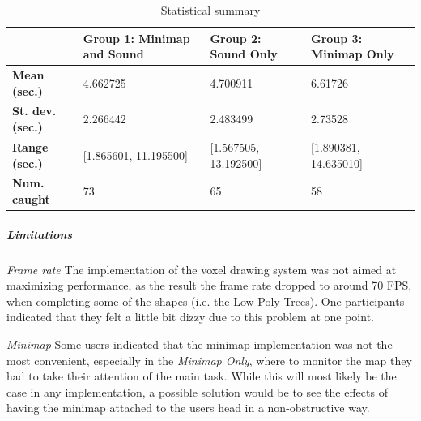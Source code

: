 \begin{table}[h]
	\begin{tabular}{|l|l|l|l|}
		\hline
		& \textbf{Group 1: Minimap and Sound} & \textbf{Group 2: Sound Only} & \textbf{Group 3: Minimap Only} \\ \hline
		\textbf{Mean (sec.)}  & 4.662725                            & 4.700911                     & 6.61726                        \\ \hline
		\textbf{St. dev. (sec.)}  & 2.266442                            & 2.483499                     & 2.73528                        \\ \hline
		\textbf{Range (sec.)} & {[}1.865601, 11.195500{]}           & {[}1.567505, 13.192500{]}    & {[}1.890381, 14.635010{]}      \\ \hline
		\textbf{Num. caught}  & 73                                  & 65                           & 58                             \\ \hline
	\end{tabular}

	\label{tab:final_study_stats}
	\caption{Statistical summary}
\end{table}

\subparagraph{Limitations} %
\textit{Frame rate} The implementation of the voxel drawing system was not aimed at maximizing performance, as the result the frame rate dropped to around 70 FPS, when completing some of the shapes (i.e. the Low Poly Trees). One participants indicated that they felt a little bit dizzy due to this problem at one point.

\textit{Minimap} Some users indicated that the minimap implementation was not the most convenient, especially in the \textit{Minimap Only}, where to monitor the map they had to take their attention of the main task. While this will most likely be the case in any implementation, a possible solution would be to see the effects of having the minimap attached to the users head in a non-obstructive way.